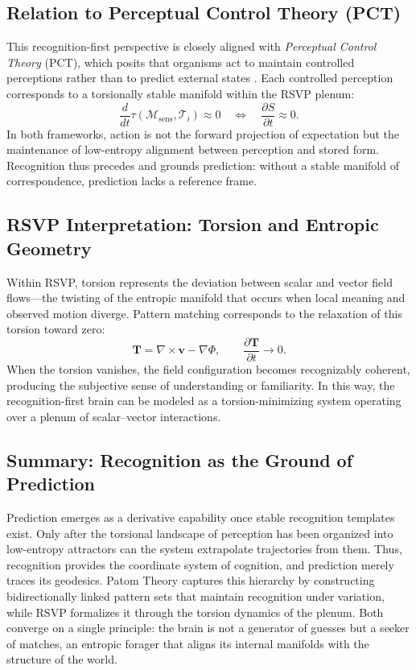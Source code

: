 \documentclass[11pt]{article}
\begin{document}
\subsection{Relation to Perceptual Control Theory (PCT)}
This recognition-first perspective is closely aligned with \textit{Perceptual Control Theory} (PCT), which posits that organisms act to maintain controlled perceptions rather than to predict external states \citep{powers1973behavior}. Each controlled perception corresponds to a torsionally stable manifold within the RSVP plenum:
\[
\frac{d}{dt} \tau(\mathcal{M}_{\mathrm{sens}}, \mathcal{T}_i) \approx 0
\quad \Longleftrightarrow \quad
\frac{\partial S}{\partial t} \approx 0.
\]
In both frameworks, action is not the forward projection of expectation but the maintenance of low-entropy alignment between perception and stored form. Recognition thus precedes and grounds prediction: without a stable manifold of correspondence, prediction lacks a reference frame.

\subsection{RSVP Interpretation: Torsion and Entropic Geometry}
Within RSVP, torsion represents the deviation between scalar and vector field flows---the twisting of the entropic manifold that occurs when local meaning and observed motion diverge. Pattern matching corresponds to the relaxation of this torsion toward zero:
\[
\mathbf{T} = \nabla \times \mathbf{v} - \nabla\Phi,
\qquad
\frac{\partial \mathbf{T}}{\partial t} \to 0.
\]
When the torsion vanishes, the field configuration becomes recognizably coherent, producing the subjective sense of understanding or familiarity. In this way, the recognition-first brain can be modeled as a torsion-minimizing system operating over a plenum of scalar--vector interactions.

\subsection{Summary: Recognition as the Ground of Prediction}
Prediction emerges as a derivative capability once stable recognition templates exist. Only after the torsional landscape of perception has been organized into low-entropy attractors can the system extrapolate trajectories from them. Thus, recognition provides the coordinate system of cognition, and prediction merely traces its geodesics. Patom Theory captures this hierarchy by constructing bidirectionally linked pattern sets that maintain recognition under variation, while RSVP formalizes it through the torsion dynamics of the plenum. Both converge on a single principle: the brain is not a generator of guesses but a seeker of matches, an entropic forager that aligns its internal manifolds with the structure of the world.
\end{document}
